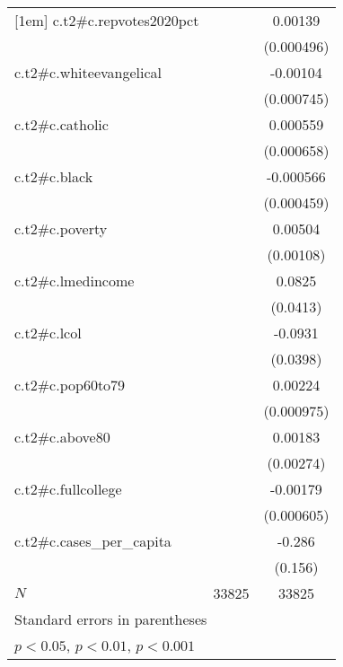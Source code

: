 {\begin{tabular}{l*{2}{c}}
[1em]
c.t2#c.repvotes2020pct&                     &     0.00139\sym{**} \\
            &                     &  (0.000496)         \\
[1em]
c.t2#c.whiteevangelical&                     &    -0.00104         \\
            &                     &  (0.000745)         \\
[1em]
c.t2#c.catholic&                     &    0.000559         \\
            &                     &  (0.000658)         \\
[1em]
c.t2#c.black&                     &   -0.000566         \\
            &                     &  (0.000459)         \\
[1em]
c.t2#c.poverty&                     &     0.00504\sym{***}\\
            &                     &   (0.00108)         \\
[1em]
c.t2#c.lmedincome&                     &      0.0825\sym{*}  \\
            &                     &    (0.0413)         \\
[1em]
c.t2#c.lcol &                     &     -0.0931\sym{*}  \\
            &                     &    (0.0398)         \\
[1em]
c.t2#c.pop60to79&                     &     0.00224\sym{*}  \\
            &                     &  (0.000975)         \\
[1em]
c.t2#c.above80&                     &     0.00183         \\
            &                     &   (0.00274)         \\
[1em]
c.t2#c.fullcollege&                     &    -0.00179\sym{**} \\
            &                     &  (0.000605)         \\
[1em]
c.t2#c.cases\_per\_capita&                     &      -0.286         \\
            &                     &     (0.156)         \\
\hline
\(N\)       &       33825         &       33825         \\
\hline\hline
\multicolumn{3}{l}{\footnotesize Standard errors in parentheses}\\
\multicolumn{3}{l}{\footnotesize \sym{*} \(p<0.05\), \sym{**} \(p<0.01\), \sym{***} \(p<0.001\)}\\
\end{tabular}
}
